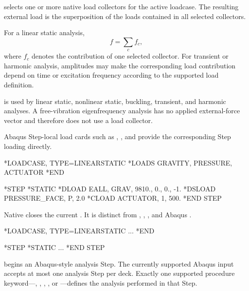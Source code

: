 
 selects one or more native load collectors for the active loadcase. The resulting external load is the superposition of the loads contained in all selected collectors.

For a linear static analysis,
\[
f=\sum_c f_c,
\]
where \(f_c\) denotes the contribution of one selected collector. For transient or harmonic analysis, amplitudes may make the corresponding load contribution depend on time or excitation frequency according to the supported load definition.

 is used by linear static, nonlinear static, buckling, transient, and harmonic analyses. A free-vibration eigenfrequency analysis has no applied external-force vector and therefore does not use a load collector.

Abaqus Step-local load cards such as , , and  provide the corresponding Step loading directly.

\exampleheading

\begin{dialectexamples}
\begin{femasterdeck}
*LOADCASE, TYPE=LINEARSTATIC
*LOADS
GRAVITY, PRESSURE, ACTUATOR
*END
\end{femasterdeck}
\begin{abaqusdeck}
*STEP
*STATIC
*DLOAD
EALL, GRAV, 9810., 0., 0., -1.
*DSLOAD
PRESSURE_FACE, P, 2.0
*CLOAD
ACTUATOR, 1, 500.
*END STEP
\end{abaqusdeck}
\end{dialectexamples}


Native  closes the current . It is distinct from , , , and Abaqus .

\exampleheading

\begin{dialectexamples}
\begin{femasterdeck}
*LOADCASE, TYPE=LINEARSTATIC
...
*END
\end{femasterdeck}
\begin{abaqusdeck}
*STEP
*STATIC
...
*END STEP
\end{abaqusdeck}
\end{dialectexamples}


 begins an Abaqus-style analysis Step. The currently supported Abaqus input accepts at most one analysis Step per deck. Exactly one supported procedure keyword---, , , , or ---defines the analysis performed in that Step.

